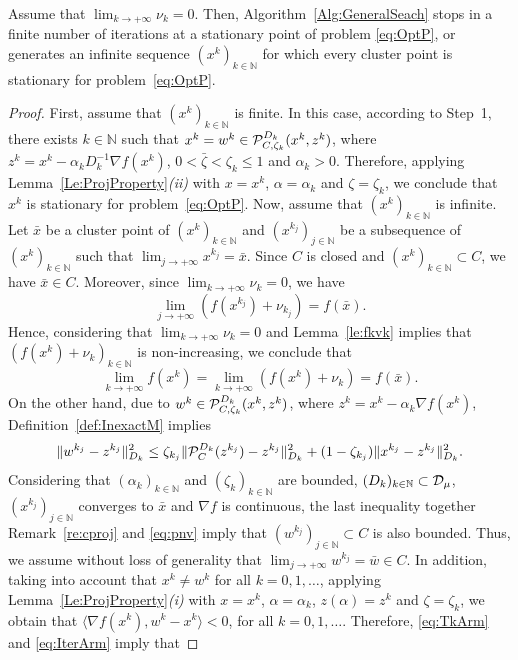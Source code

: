 \begin{proposition} \label{pr:statArm}
	Assume that $\lim_{k\to +\infty} \nu_{k} = 0$.   Then, Algorithm~\ref{Alg:GeneralSeach} stops in a finite number of iterations at a stationary point of problem \eqref{eq:OptP}, or generates an infinite sequence $(x^k)_{k\in\mathbb{N}}$ for which every cluster point is stationary for problem~\eqref{eq:OptP}.
\end{proposition}
\begin{proof}
	First, assume that $(x^k)_{k\in\mathbb{N}}$ is finite. In this case, according to Step~1,   there exists $k \in \mathbb{N}$ such that $x^k = w^k \in{\cal P}_{C, \zeta_k}^{D_k}(x^{k}, z^k)$, where $z^k = x^{k}-\alpha_k D_k^{-1}\nabla f(x^{k})$, $0 <{\bar \zeta}<\zeta_k \leq 1$ and $\alpha_k > 0$. Therefore, applying Lemma~\ref{Le:ProjProperty}{\it (ii)} with $x = x^{k}$, $\alpha = \alpha_k$ and $\zeta= \zeta_k$, we conclude that $x^k$ is stationary for problem~\eqref{eq:OptP}.  Now, assume that $(x^k)_{k\in\mathbb{N}}$ is infinite.   Let ${\bar x}$ be a cluster point of $(x^k)_{k\in\mathbb{N}}$ and $(x^{k_j})_{j\in\mathbb{N}}$ be a subsequence of $(x^k)_{k\in\mathbb{N}}$ such that $\lim_{j\to +\infty} x^{k_j} = \bar{x}$. Since $C$ is closed and  $(x^k)_{k\in\mathbb{N}}\subset C$,  we have $\bar{x} \in C$. Moreover,     since  $\lim_{k\to +\infty} \nu_{k} = 0$, we have
	$$\lim_{j\to +\infty}\left(f(x^{k_j}) +\nu_{k_j}\right) =f(\bar{x}).$$
	Hence, considering that  $\lim_{k\to +\infty} \nu_{k} = 0$ and Lemma~\ref{le:fkvk} implies  that   $\left(f(x^k)+\nu_{k}\right)_{k\in\mathbb{N}}$  is  non-increasing, we conclude that
	$$\lim_{k\to +\infty} f(x^{k})= \lim_{k\to +\infty}\left(f(x^{k}) +\nu_{k}\right) =f(\bar{x}).$$
	On the other hand,  due to  $w^k \in {\cal P}_{C, \zeta_k}^{D_k}(x^{k}, z^k)$, where $z^k = x^{k}-\alpha_k \nabla f(x^{k})$,  Definition~\ref{def:InexactM} implies
	\begin{equation} \label{eq:bsw}
		\|w^{k_j} - z^{k_j}\|_{D_k}^2\leq \zeta_{k_j} \| {\cal P}_{C}^{ D_k}(z^{k_j})-z^{k_j}\|_{D_k}^2+(1-\zeta_{k_j})\|x^{k_j}-z^{k_j}\|_{D_k}^2 .
	\end{equation}
	Considering that $(\alpha_k)_{k\in\mathbb{N}}$ and $(\zeta_k)_{k\in\mathbb{N}}$ are bounded, $(D_k)_{k\in\mathbb{N}}\subset  {\cal D}_{\mu}$,  $(x^{k_j})_{j\in\mathbb{N}}$ converges to ${\bar x}$ and $\nabla f$ is continuous, the last inequality together Remark~\ref{re:cproj} and \eqref{eq:pnv}  imply that $(w^{k_j})_{j\in\mathbb{N}}\subset C$ is also bounded. Thus, we assume without loss of generality that $\lim_{j\to +\infty} w^{k_j} = \bar{w}\in C$.  In addition,  taking into account that  $x^k \neq w^k$ for all $k = 0,1, \ldots$, applying Lemma~\ref{Le:ProjProperty}{\it (i)} with $x = x^{k}$, $\alpha = \alpha_k$, $z(\alpha)=z^k$ and $\zeta= \zeta_k$, we obtain  that $\langle \nabla f(x^k), w^k- x^k \rangle < 0$, for all $k = 0, 1, \ldots$. Therefore,  \eqref{eq:TkArm} and \eqref{eq:IterArm} imply that

\end{proof}
